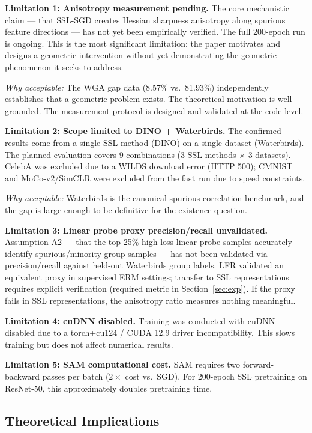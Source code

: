 \textbf{Limitation 1: Anisotropy measurement pending.}
The core mechanistic claim --- that SSL-SGD creates Hessian sharpness anisotropy along spurious feature directions --- has not yet been empirically verified. The full 200-epoch run is ongoing. This is the most significant limitation: the paper motivates and designs a geometric intervention without yet demonstrating the geometric phenomenon it seeks to address.

\textit{Why acceptable:} The WGA gap data (8.57\% vs.\ 81.93\%) independently establishes that a geometric problem exists. The theoretical motivation \citep{gatmiry2024sam, park2025g2sam} is well-grounded. The measurement protocol is designed and validated at the code level.

\textbf{Limitation 2: Scope limited to DINO + Waterbirds.}
The confirmed results come from a single SSL method (DINO) on a single dataset (Waterbirds). The planned evaluation covers 9 combinations (3 SSL methods $\times$ 3 datasets). CelebA was excluded due to a WILDS download error (HTTP 500); CMNIST and MoCo-v2/SimCLR were excluded from the fast run due to speed constraints.

\textit{Why acceptable:} Waterbirds is the canonical spurious correlation benchmark, and the gap is large enough to be definitive for the existence question.

\textbf{Limitation 3: Linear probe proxy precision/recall unvalidated.}
Assumption A2 --- that the top-25\% high-loss linear probe samples accurately identify spurious/minority group samples --- has not been validated via precision/recall against held-out Waterbirds group labels. LFR \citep{ghaznavi2023lfr} validated an equivalent proxy in supervised ERM settings; transfer to SSL representations requires explicit verification (required metric in Section~\ref{sec:exp}). If the proxy fails in SSL representations, the anisotropy ratio measures nothing meaningful.

\textbf{Limitation 4: cuDNN disabled.}
Training was conducted with cuDNN disabled due to a torch+cu124 / CUDA 12.9 driver incompatibility. This slows training but does not affect numerical results.

\textbf{Limitation 5: SAM computational cost.}
SAM requires two forward-backward passes per batch ($2\times$ cost vs.\ SGD). For 200-epoch SSL pretraining on ResNet-50, this approximately doubles pretraining time.

\subsection{Theoretical Implications}

